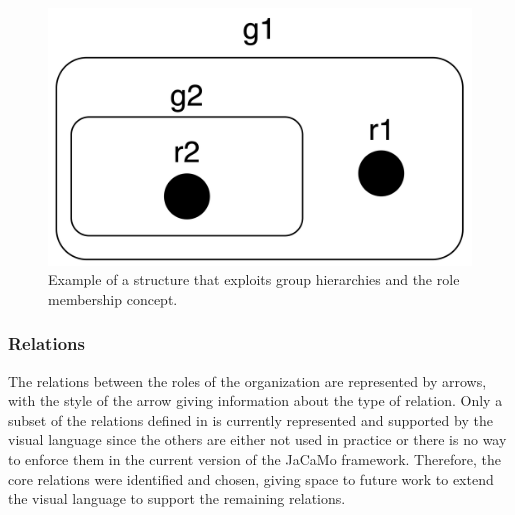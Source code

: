 \begin{figure}[H]
    \centering
    \includegraphics[width=0.5\linewidth]{images/visual-language/groups.png}
    \caption{Example of a structure that exploits group hierarchies and the role membership concept.}
    \label{fig:groups}
\end{figure}

\subsubsection{Relations}
The relations between the roles of the organization are represented by arrows, with the style of the arrow giving information about the type of relation.
Only a subset of the relations defined in \moise{} is currently represented and supported by the visual language since the others are either not used in practice or there is no way to enforce them in the current version of the JaCaMo framework.
Therefore, the core relations were identified and chosen, giving space to future work to extend the visual language to support the remaining relations.

